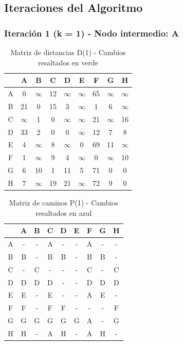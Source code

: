 \documentclass[12pt]{article}
\begin{document}
\subsection{Iteraciones del Algoritmo}
\clearpage
\subsubsection{Iteración 1 (k = 1) - Nodo intermedio: A}
\begin{table}[h!]
\centering
\begin{tabular}{|c|c|c|c|c|c|c|c|c|}
\hline
 & A & B & C & D & E & F & G & H \\\hline
A & 0 & $\infty$ & 12 & $\infty$ & $\infty$ & 65 & $\infty$ & $\infty$ \\\hline
B & 21 & 0 & 15 & 3 & $\infty$ & 1 & 6 & $\infty$ \\\hline
C & $\infty$ & 1 & 0 & $\infty$ & $\infty$ & 21 & $\infty$ & 16 \\\hline
D & 33 & 2 & 0 & 0 & $\infty$ & 12 & 7 & 8 \\\hline
E & 4 & $\infty$ & 8 & $\infty$ & 0 & \cellcolor{lightgreen} 69 & 11 & $\infty$ \\\hline
F & 1 & $\infty$ & 9 & 4 & $\infty$ & 0 & $\infty$ & 10 \\\hline
G & 6 & 10 & 1 & 11 & 5 & \cellcolor{lightgreen} 71 & 0 & 0 \\\hline
H & 7 & $\infty$ & \cellcolor{lightgreen} 19 & 21 & $\infty$ & \cellcolor{lightgreen} 72 & 9 & 0 \\\hline
\end{tabular}
\caption{Matriz de distancias D(1) - Cambios resaltados en verde}
\end{table}

\begin{table}[h!]
\centering
\begin{tabular}{|c|c|c|c|c|c|c|c|c|}
\hline
 & A & B & C & D & E & F & G & H \\\hline
A & - & - & A & - & - & A & - & - \\\hline
B & B & - & B & B & - & B & B & - \\\hline
C & - & C & - & - & - & C & - & C \\\hline
D & D & D & D & - & - & D & D & D \\\hline
E & E & - & E & - & - & \cellcolor{lightblue} A & E & - \\\hline
F & F & - & F & F & - & - & - & F \\\hline
G & G & G & G & G & G & \cellcolor{lightblue} A & - & G \\\hline
H & H & - & \cellcolor{lightblue} A & H & - & \cellcolor{lightblue} A & H & - \\\hline
\end{tabular}
\caption{Matriz de caminos P(1) - Cambios resaltados en azul}
\end{table}
\end{document}
